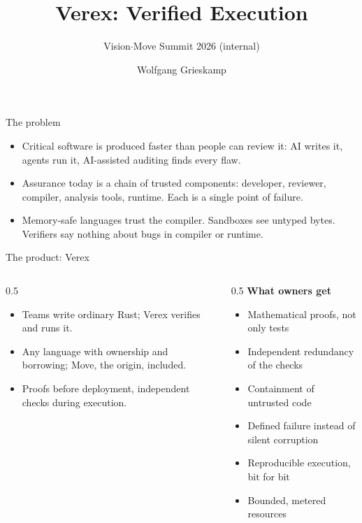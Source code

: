 \documentclass[aspectratio=169,11pt]{beamer}
\title{Verex: Verified Execution}
\subtitle{\small Vision\quad$\cdot$\quad Move Summit 2026 (internal)}
\author{Wolfgang Grieskamp}
\institute{Aptos Labs}
\date{}
\begin{document}
{
  \maketitle
}

\begin{frame}{The problem}
  \begin{itemize}\setlength{\itemsep}{6pt}
    \item Critical software is produced faster than people can review it: AI writes it, agents run it, AI-assisted auditing finds every flaw.
    \item Assurance today is a chain of trusted components: developer, reviewer, compiler, analysis tools, runtime. Each is a single point of failure.
    \item Memory-safe languages trust the compiler. Sandboxes see untyped bytes. Verifiers say nothing about bugs in compiler or runtime.
  \end{itemize}
\end{frame}

\begin{frame}{The product: Verex}
  \begin{columns}[T]
    \begin{column}{0.5\textwidth}
      \begin{itemize}\setlength{\itemsep}{4pt}
        \item Teams write ordinary Rust; Verex verifies and runs it.
        \item Any language with ownership and borrowing; Move, the origin, included.
        \item Proofs before deployment, independent checks during execution.
      \end{itemize}
    \end{column}
    \begin{column}{0.5\textwidth}
      \textbf{What owners get}
      \begin{itemize}\setlength{\itemsep}{2pt}\small
        \item Mathematical proofs, not only tests
        \item Independent redundancy of the checks
        \item Containment of untrusted code
        \item Defined failure instead of silent corruption
        \item Reproducible execution, bit for bit
        \item Bounded, metered resources
      \end{itemize}
    \end{column}
  \end{columns}
\end{frame}
\end{document}
